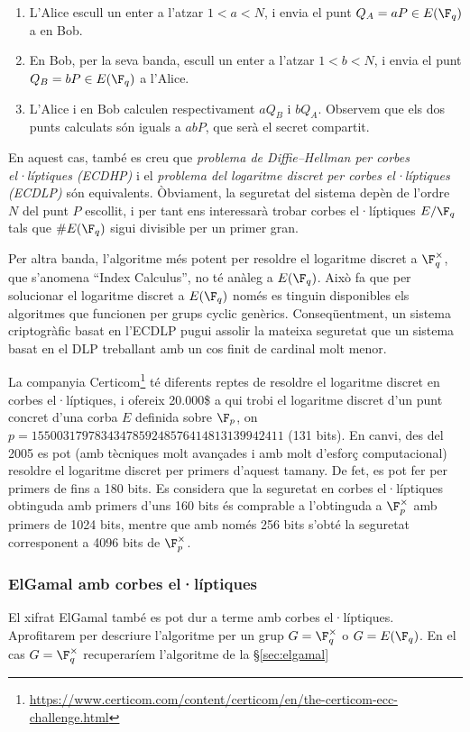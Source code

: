 \begin{enumerate}
    \item L'Alice escull un enter a l'atzar $1<a<N$, i envia el punt $Q_A=aP\in E(\F_q)$ a en Bob.
    \item En Bob, per la seva banda, escull un enter a l'atzar $1<b<N$, i envia el punt $Q_B=bP\in E(\F_q)$ a l'Alice.
    \item L'Alice i en Bob calculen respectivament $aQ_B$ i $bQ_A$. Observem que els dos punts calculats són iguals a $abP$, que serà el secret compartit.
\end{enumerate}

En aquest cas, també es creu que \emph{problema de Diffie--Hellman per corbes el·líptiques (ECDHP)} i el \emph{problema del logaritme discret per corbes el·líptiques (ECDLP)} són equivalents. Òbviament, la seguretat del sistema depèn de l'ordre $N$ del punt $P$ escollit, i per tant ens interessarà trobar corbes el·líptiques $E/\F_q$ tals que $\#E(\F_q)$ sigui divisible per un primer gran.

Per altra banda, l'algoritme més potent per resoldre el logaritme discret a $\F_q^\times$, que s'anomena ``Index Calculus'', no té anàleg a $E(\F_q)$. Això fa que per solucionar el logaritme discret a $E(\F_q)$ només es tinguin disponibles els algoritmes que funcionen per grups cyclic genèrics. Conseqüentment, un sistema criptogràfic basat en l'ECDLP pugui assolir la mateixa seguretat que un sistema basat en el DLP treballant amb un cos finit de cardinal molt menor.

La companyia Certicom\footnote{\url{https://www.certicom.com/content/certicom/en/the-certicom-ecc-challenge.html}} té diferents reptes de resoldre el logaritme discret en corbes el·líptiques, i ofereix 20.000\$ a qui trobi el logaritme discret d'un punt concret d'una corba $E$ definida sobre $\F_p$, on $p=1550031797834347859248576414813139942411$ (131 bits). En canvi, des del 2005 es pot (amb tècniques molt avançades i amb molt d'esforç computacional) resoldre el logaritme discret per primers d'aquest tamany. De fet, es pot fer per primers de fins a 180 bits. Es considera que la seguretat en corbes el·líptiques obtinguda amb primers d'uns 160 bits és comprable a l'obtinguda a $\F_p^\times$ amb primers de 1024 bits, mentre que amb només 256 bits s'obté la seguretat corresponent a 4096 bits de $\F_p^\times$.

 \subsubsection{ElGamal amb corbes el·líptiques}
 El xifrat ElGamal també es pot dur a terme amb corbes el·líptiques. Aprofitarem per descriure l'algoritme per un grup $G=\F_q^\times$ o $G=E(\F_q)$. En el cas $G=\F_q^\times$ recuperaríem l'algoritme de la \S\ref{sec:elgamal}
 
